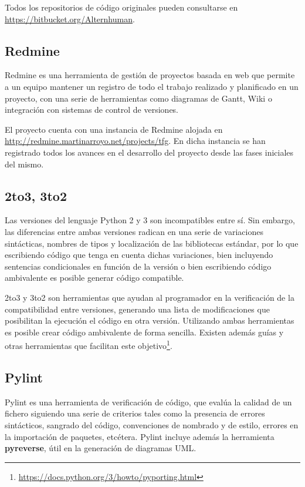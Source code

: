 Todos los repositorios de código originales pueden consultarse en \href{https://bitbucket.org/Alternhuman}{https://bitbucket.org/Alternhuman}.

\subsection{Redmine}

Redmine es una herramienta de gestión de proyectos basada en web que permite a un equipo mantener un registro de todo el trabajo realizado y planificado en un proyecto, con una serie de herramientas como diagramas de Gantt, Wiki o integración con sistemas de control de versiones.

El proyecto cuenta con una instancia de Redmine alojada en \href{http://redmine.martinarroyo.net/projects/tfg}{http://redmine.martinarroyo.net/projects/tfg}. En dicha instancia se han registrado todos los avances en el desarrollo del proyecto desde las fases iniciales del mismo.

\subsection{2to3, 3to2}

Las versiones del lenguaje Python 2 y 3 son incompatibles entre sí. Sin embargo, las diferencias entre ambas versiones radican en una serie de variaciones sintácticas, nombres de tipos y localización de las bibliotecas estándar, por lo que escribiendo código que tenga en cuenta dichas variaciones, bien incluyendo sentencias condicionales en función de la versión o bien escribiendo código ambivalente es posible generar código compatible.

2to3 y 3to2 son herramientas que ayudan al programador en la verificación de la compatibilidad entre versiones, generando una lista de modificaciones que posibilitan la ejecución el código en otra versión. Utilizando ambas herramientas es posible crear código ambivalente de forma sencilla. Existen además guías y otras herramientas que facilitan este objetivo\footnote{\href{https://docs.python.org/3/howto/pyporting.html}{https://docs.python.org/3/howto/pyporting.html}}.

\subsection{Pylint}

Pylint es una herramienta de verificación de código, que evalúa la calidad de un fichero siguiendo una serie de criterios tales como la presencia de errores sintácticos, sangrado del código, convenciones de nombrado y de estilo, errores en la importación de paquetes, etcétera. Pylint incluye además la herramienta \textbf{pyreverse}, útil en la generación de diagramas UML.


